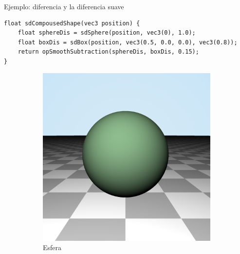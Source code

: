 \begin{frame}[fragile]{Ejemplo: diferencia y la diferencia suave}
\begin{listing}
\begin{verbatim}
float sdCompousedShape(vec3 position) {
    float sphereDis = sdSphere(position, vec3(0), 1.0);
    float boxDis = sdBox(position, vec3(0.5, 0.0, 0.0), vec3(0.8));  
    return opSmoothSubtraction(sphereDis, boxDis, 0.15);
}
\end{verbatim}
\end{listing}

\begin{figure}[htp]
 \centering
\begin{subfigure}[b]{0.2\textwidth}
   \includegraphics[width=\textwidth]{img/RightSphere}
   \caption{Esfera}
 \end{subfigure}
~
 \begin{subfigure}[b]{0.2\textwidth}

\end{subfigure}
\end{figure}
\end{frame}
